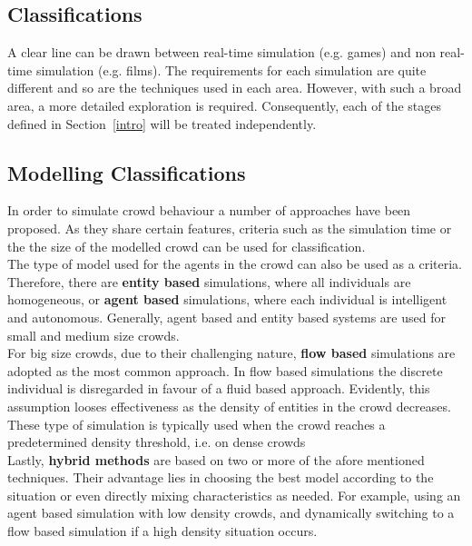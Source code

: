 \documentclass[6pt]{article} %
\begin{document}
\begin{multicols}{2}
\section{Classifications}

A clear line can be drawn between real-time simulation (e.g. games) and non real-time simulation (e.g. films).
The requirements for each simulation are quite different and so are the techniques used in each area.
However, with such a broad area, a more detailed exploration is required.
Consequently, each of the stages defined in Section~\ref{intro} will be treated independently.

\subsection{Modelling Classifications}
\label{subsec:ModelClassification}

In order to simulate crowd behaviour a number of approaches have been proposed.
As they share certain features, criteria such as the simulation time or the the size of the modelled crowd can be used for classification.\\

The type of model used for the agents in the crowd can also be used as a criteria.
Therefore, there are \textbf{entity based} simulations, where all individuals are homogeneous, or \textbf{agent based} simulations, where each individual is intelligent and autonomous.
Generally, agent based and entity based systems are used for small and medium size crowds.\\

For big size crowds, due to their challenging nature, \textbf{flow based} simulations are adopted as the most common approach.
In flow based simulations the discrete individual is disregarded in favour of a fluid based approach.
Evidently, this assumption looses effectiveness as the density of entities in the crowd decreases.
These type of simulation is typically used when the crowd reaches a predetermined density threshold, i.e. on dense crowds\\

Lastly, \textbf{hybrid methods} are based on two or more of the afore mentioned techniques.
Their advantage lies in choosing the best model according to the situation or even directly mixing characteristics as needed.
For example, using an agent based simulation with low density crowds, and dynamically switching to a flow based simulation if a high density situation occurs.


\end{multicols}
\end{document}

